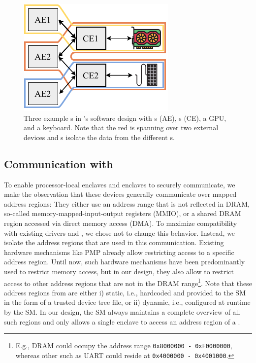 \begin{figure}[tbp]
     \centering
     \includegraphics[width=0.6\linewidth]{chapters/PIE/images/softwaredesign.pdf}
     \vspace{-1em}
     \caption{Three example \nameenclave{}s in \name{}'s software design with \app{}s (AE), \ce{}s (CE), a GPU, and a keyboard. Note that the red \nameenclave{} is spanning over two external devices and \ce{}s isolate the data from the different \app{}s.}
     \label{fig:sharedMemory}
\end{figure}

\subsection{Communication with \sphw}
\label{sec:approach:comm}

To enable processor-local enclaves and \sphw enclaves to securely communicate, we make the observation that these devices generally communicate over mapped address regions: They either use an address range that is not reflected in DRAM, so-called memory-mapped-input-output registers (MMIO), or a shared DRAM region accessed via direct memory access (DMA). To maximize compatibility with existing drivers and \sphw, we chose not to change this behavior. Instead, we isolate the address regions that are used in this communication. Existing hardware mechanisms like PMP already allow restricting access to a specific address region. Until now, such hardware mechanisms have been predominantly used to restrict memory access, but in our design, they also allow to restrict access to other address regions that are not in the DRAM range\footnote{E.g., DRAM could occupy the address range \texttt{0x8000000 - 0xF0000000}, whereas other \sphw such as UART could reside at \texttt{0x4000000 - 0x4001000}.}. Note that these address regions from \sphw are either i) static, i.e., hardcoded and provided to the SM in the form of a trusted device tree file, or ii) dynamic, i.e., configured at runtime by the SM. In our design, the SM always maintains a complete overview of all such regions and only allows a single enclave to access an address region of a \sphw.


